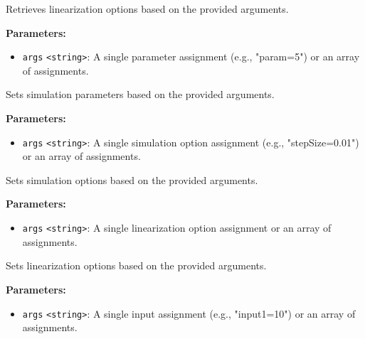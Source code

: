 \documentclass[12pt,a4paper]{article}
\begin{document}
\noindent Retrieves linearization options based on the provided arguments.

\vspace{5mm}
\noindent {}


\noindent \textbf{Parameters:}
\begin{itemize}
  \item \texttt{args} \texttt{<string>}: A single parameter assignment (e.g., "param=5") or an array of assignments.
\end{itemize}

\noindent Sets simulation parameters based on the provided arguments.

\vspace{5mm}
\noindent {}


\noindent \textbf{Parameters:}
\begin{itemize}
  \item \texttt{args} \texttt{<string>}: A single simulation option assignment (e.g., "stepSize=0.01") or an array of assignments.
\end{itemize}

\noindent Sets simulation options based on the provided arguments.

\vspace{5mm}
\noindent {}


\noindent \textbf{Parameters:}
\begin{itemize}
  \item \texttt{args} \texttt{<string>}: A single linearization option assignment or an array of assignments.
\end{itemize}

\noindent Sets linearization options based on the provided arguments.

\vspace{5mm}
\noindent {}


\noindent \textbf{Parameters:}
\begin{itemize}
  \item \texttt{args} \texttt{<string>}: A single input assignment (e.g., "input1=10") or an array of assignments.
\end{itemize}
\end{document}

